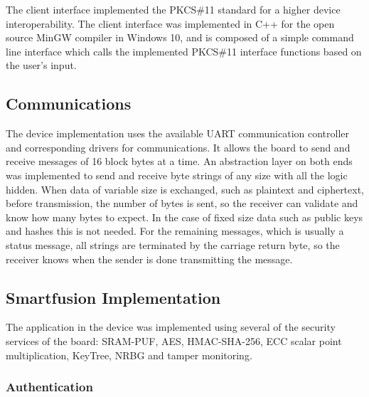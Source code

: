 The client interface implemented the \ac{PKCS}\#11 standard for a higher device interoperability. The client interface was implemented in C++ for the open source MinGW compiler in Windows 10, and is composed of a simple command line interface which calls the implemented \ac{PKCS}\#11 interface functions based on the user's input.

\subsection{Communications}\label{chap:implementation:app:comms}

The device implementation uses the available \ac{UART} communication controller and corresponding drivers for communications.
It allows the board to send and receive messages of 16 block bytes at a time.
An abstraction layer on both ends was implemented to send and receive byte strings of any size with all the logic hidden.
When data of variable size is exchanged, such as plaintext and ciphertext, before transmission, the number of bytes is sent, so the receiver can validate and know how many bytes to expect.
In the case of fixed size data such as public keys and hashes this is not needed. For the remaining messages, which is usually a status message, all strings are terminated by the carriage return byte, so the receiver knows when the sender is done transmitting the message.

\subsection{Smartfusion Implementation}\label{chap:implementation:app:board}

The application in the device was implemented using several of the security services of the board: SRAM-PUF, AES, HMAC-SHA-256, ECC scalar point multiplication, KeyTree, \ac{NRBG} and tamper monitoring.

\subsubsection*{Authentication}

